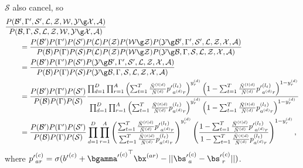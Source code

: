 \documentclass[10pt,english,oneside]{article}
\begin{document}
$\mathcal{S}$ also cancel, so
\begin{align}
  &\frac{
    P(\mathcal{B}', \Gamma', \mathcal{S}', \mathcal{L},
  \mathcal{Z}, \mathcal{W}, \mathcal{Y} \g \mathcal{X}, \mathcal{A})
  }{    P(\mathcal{B}, \Gamma, \mathcal{S}, \mathcal{L},
  \mathcal{Z}, \mathcal{W}, \mathcal{Y} \g \mathcal{X}, \mathcal{A})}
  \notag \\
  &\qquad =
  \frac{
  P(\mathcal{B'}) P(\Gamma') P(\mathcal{S}') P(\mathcal{L})
  P(\mathcal{Z})
  P(\mathcal{W} \g \mathcal{Z}) P(\mathcal{Y} \g \mathcal{B}',
  \Gamma', \mathcal{S}', \mathcal{L}, \mathcal{Z}, \mathcal{X}, \mathcal{A})}{
  P(\mathcal{B}) P(\Gamma) P(\mathcal{S}) P(\mathcal{L})
  P(\mathcal{Z})
  P(\mathcal{W} \g \mathcal{Z}) P(\mathcal{Y} \g \mathcal{B}, \Gamma,
  \mathcal{S}, \mathcal{L}, \mathcal{Z},
  \mathcal{X}, \mathcal{A})}\\
  &\qquad = \frac{P(\mathcal{B}')P(\Gamma')P(\mathcal{S'})P(\mathcal{Y} \g
    \mathcal{B}', \Gamma', \mathcal{S}', \mathcal{L}, \mathcal{Z},
    \mathcal{X}, \mathcal{A})}{P(\mathcal{B}) P(\Gamma) P(\mathcal{S})
  P(\mathcal{Y} \g \mathcal{B}, \Gamma, \mathcal{S}, \mathcal{L},
  \mathcal{Z}, \mathcal{X}, \mathcal{A})}\\
  &\qquad = \frac{P(\mathcal{B}') P(\Gamma') P(\mathcal{S}')}{P(\mathcal{B})
    P(\Gamma) P(\mathcal{S})} \frac{
    \prod_{d=1}^D \prod_{r=1}^A \left(
    \sum_{t=1}^T \frac{\bar{N}^{(t|d)}}{\bar{N}^{(d)}}
    {p'}^{(l_t)}_{a^{(d)}r}
  \right)^{y^{(d)}_r} \left( 1 -
    \sum_{t=1}^T \frac{\bar{N}^{(t|d)}}{\bar{N}^{(d)}}
    {p'}^{(l_t)}_{a^{(d)}r}  
  \right)^{1 - y^{(d)}_r}}{
    \prod_{d=1}^D \prod_{r=1}^A \left(
    \sum_{t=1}^T \frac{\bar{N}^{(t|d)}}{\bar{N}^{(d)}}
    {p}^{(l_t)}_{a^{(d)}r}
  \right)^{y^{(d)}_r} \left( 1 -
    \sum_{t=1}^T \frac{\bar{N}^{(t|d)}}{\bar{N}^{(d)}}
    {p}^{(l_t)}_{a^{(d)}r}  
  \right)^{1 - y^{(d)}_r}}    \\
  &\qquad = \frac{P(\mathcal{B}') P(\Gamma') P(\mathcal{S}')}{P(\mathcal{B})
    P(\Gamma) P(\mathcal{S})} \prod_{d=1}^D \prod_{r=1}^A
  \left( \frac{    \sum_{t=1}^T \frac{\bar{N}^{(t|d)}}{\bar{N}^{(d)}}
    {p'}^{(l_t)}_{a^{(d)}r}
}{          \sum_{t=1}^T \frac{
      \bar{N}^{(t|d)}}{\bar{N}^{(d)}}
    {p}^{(l_t)}_{a^{(d)}r}} \right)^{y^{(d)}_r}
  \left( \frac{  1 -
    \sum_{t=1}^T \frac{\bar{N}^{(t|d)}}{\bar{N}^{(d)}}
    {p'}^{(l_t)}_{a^{(d)}r}  }{  1 -
    \sum_{t=1}^T \frac{\bar{N}^{(t|d)}}{\bar{N}^{(d)}}
    {p}^{(l_t)}_{a^{(d)}r}  
} \right)^{1 - y^{(d)}_r},
\end{align}
where ${p'}^{(c)}_{ar} = \sigma({b'}^{(c)} + {{\bgamma'}^{(c)}}^{\top}
\bx^{(ar)} - ||{\bs'}^{(c)}_a - {\bs'}^{(c)}_r||)$.
\end{document}
